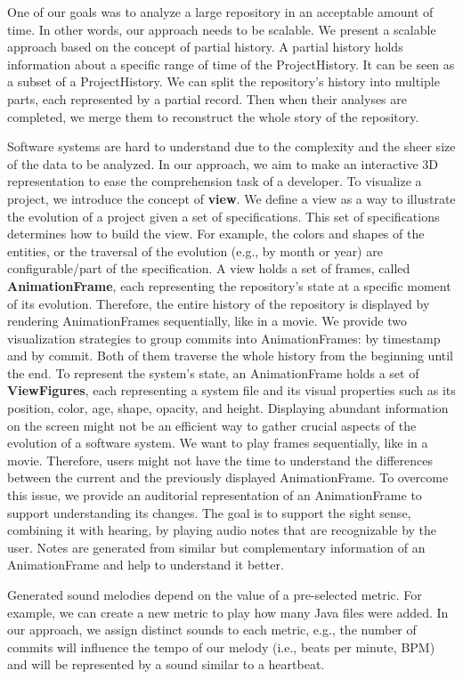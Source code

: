 \documentclass[11pt,twoside,english,singlespacing,headsepline,consistentlayout]{auxiliary/si-msc-thesis}
\begin{document}
One of our goals was to analyze a large repository in an acceptable amount of time. 
In other words, our approach needs to be scalable. We present a scalable approach based on the concept of partial history.
A partial history holds information about a specific range of time of the ProjectHistory. 
It can be seen as a subset of a ProjectHistory. 
We can split the repository's history into multiple parts, each represented by a partial record. Then when their analyses are completed, we merge them to reconstruct the whole story of the repository.

Software systems are hard to understand due to the complexity and the sheer size of the data to be analyzed.
In our approach, we aim to make an interactive 3D representation to ease the comprehension task of a developer. 
To visualize a project, we introduce the concept of \textbf{view}. We define a view as a way to illustrate the evolution of a project given a set of specifications. This set of specifications determines how to build the view. For example, the colors and shapes of the entities, or the traversal of the evolution (e.g., by month or year) are configurable/part of the specification. A view holds a set of frames, called \textbf{AnimationFrame}, each representing the repository's state at a specific moment of its evolution. Therefore, the entire history of the repository is displayed by rendering AnimationFrames sequentially, like in a movie. 
We provide two visualization strategies to group commits into AnimationFrames: by timestamp and by commit. Both of them traverse the whole history from the beginning until the end.
To represent the system's state, an AnimationFrame holds a set of \textbf{ViewFigures}, each representing a system file and its visual properties such as its position, color, age, shape, opacity, and height.
Displaying abundant information on the screen might not be an efficient way to gather crucial aspects of the evolution of a software system. We want to play frames sequentially, like in a movie. Therefore, users might not have the time to understand the differences between the current and the previously displayed AnimationFrame. To overcome this issue, we provide an auditorial representation of an AnimationFrame to support understanding its changes. The goal is to support the sight sense, combining it with hearing, by playing audio notes that are recognizable by the user. Notes are generated from similar but complementary information of an AnimationFrame and help to understand it better. 

Generated sound melodies depend on the value of a pre-selected metric. For example, we can create a new metric to play how many Java files were added. In our approach, we assign distinct sounds to each metric, e.g., the number of commits will influence the tempo of our melody (i.e., beats per minute, BPM) and will be represented by a sound similar to a heartbeat.
\end{document}
